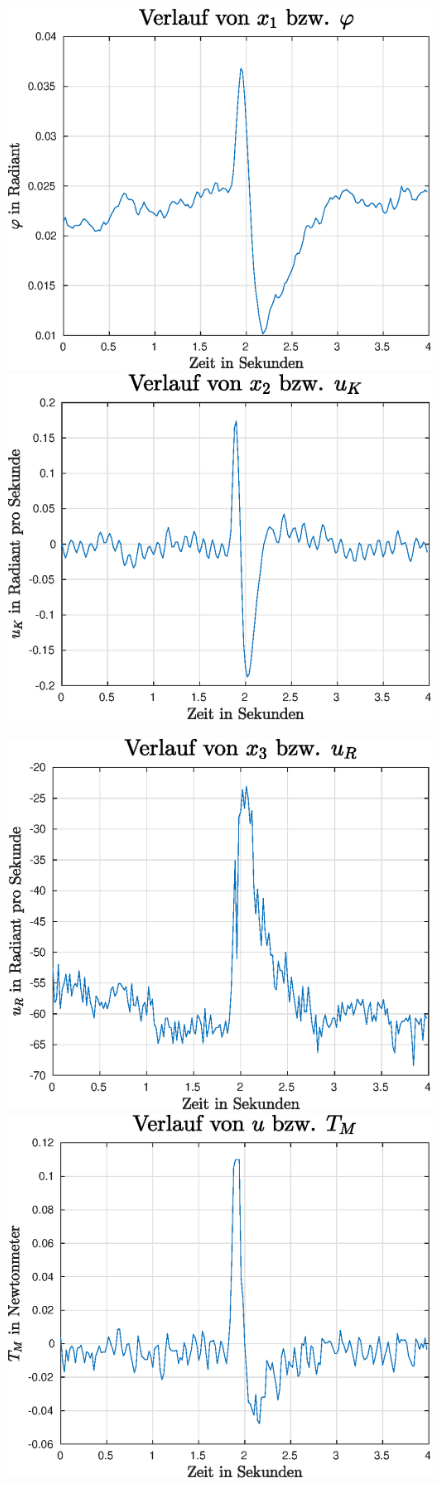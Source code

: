 \begin{figure}[h!]
\centering
\includegraphics[width=0.45\linewidth]{img/edge_exp1_phi.eps}
\includegraphics[width=0.45\linewidth]{img/edge_exp1_uk.eps}
\vspace{0.5cm}

\includegraphics[width=0.45\linewidth]{img/edge_exp1_ur.eps}
\includegraphics[width=0.45\linewidth]{img/edge_exp1_tm.eps}
\end{figure}

